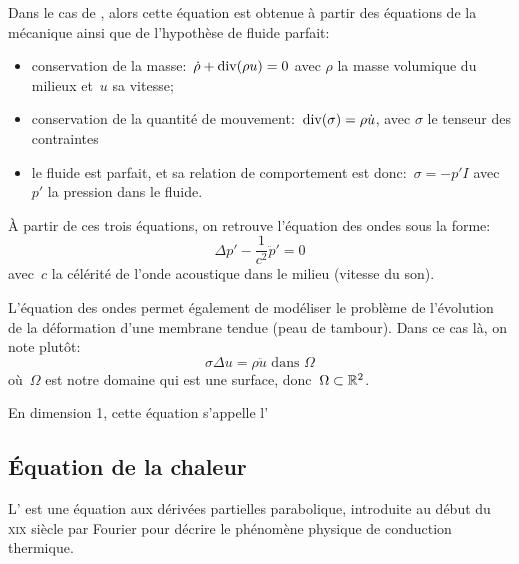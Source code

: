 \medskip
Dans le cas de , alors cette équation est obtenue à partir des équations de la mécanique ainsi que de l'hypothèse de fluide parfait:
\begin{itemize}
  \item conservation de la masse:~$\dot{\rho}+\operatorname{div}(\rho u)=0$ avec 
	$\rho$ la masse volumique du milieux et~$u$ sa vitesse;
  \item conservation de la quantité de mouvement:~$\operatorname{div}(\sigma)=\rho\dot{u}$, avec
	$\sigma$ le tenseur des contraintes
  \item le fluide est parfait, et sa relation de comportement est donc:~$\sigma=-p'I$ avec
	$p'$ la pression dans le fluide.
\end{itemize}
\medskipvm
À partir de ces trois équations, on retrouve l'équation des ondes sous la forme:
\begin{equation}\label{Eq-EqOndeAcou}
\Delta p' - \dfrac1{c^2} \ddot{p}' = 0
\end{equation}
avec~$c$ la célérité de l'onde acoustique dans le milieu (vitesse du son).

\medskip
L'équation des ondes permet également de modéliser le problème de l'évolution de la déformation d'une membrane tendue (peau de tambour). Dans ce cas là, on note plutôt:
\begin{equation}
 \sigma \Delta u = \rho\ddot{u} \text{ dans }\Omega
\end{equation}
où~$\Omega$ est notre domaine qui est une surface, donc~$\Omega\subset\mathbb R^2$.

 En dimension 1, cette équation s'appelle l'


\medskip
\subsection{Équation de la chaleur}

L' est une équation aux dérivées partielles parabolique, introduite au début du \textsc{xix} siècle par Fourier pour décrire le phénomène physique de conduction thermique.

